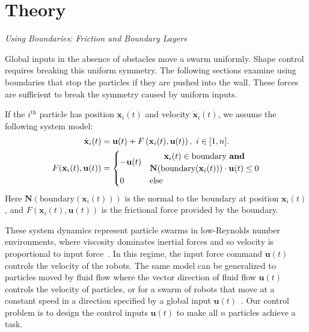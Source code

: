 \section{Theory}
\label{sec:theory}

\emph{Using Boundaries: Friction and Boundary Layers}\label{subsec:WallFriction}

Global inputs in the absence of obstacles move a swarm uniformly.  
Shape control requires breaking this uniform symmetry.
The following sections examine using boundaries that stop the particles if they are pushed into the wall.
 These forces are  sufficient to break the symmetry caused by uniform inputs.  
 
 If the $i^{\textrm{th}}$ particle has position $\mathbf{x}_i(t)$ and velocity $\dot{\mathbf{x}}_i(t)$,  we assume the following system model:
 \begin{align}\label{eq:swarmDynamicsAndFric} 
\dot{\mathbf{x}}_i(t)
 &=
 \mathbf{u}(t)
 +F \left( \mathbf{x}_i(t), \mathbf{u}(t) \right), ~i \in [1,n].\\
 F(\mathbf{x}_i(t), \mathbf{u}(t)) &= \begin{cases}
  - \mathbf{u}(t) &\begin{matrix} \mathbf{x}_i(t) \in  \textrm{boundary \textbf{and}}\\
\mathbf{N}(\textrm{boundary$(\mathbf{x}_i(t))$})\cdot   \mathbf{u}(t) \le 0 \end{matrix}
 \\
 0 & \textrm{else} 
 \end{cases}\nonumber
 \end{align}
 Here $\mathbf{N}(\textrm{boundary$(\mathbf{x}_i(t))$})$ is the normal to the boundary at position $\mathbf{x}_i(t)$, and
 $F(\mathbf{x}_i(t), \mathbf{u}(t)) $ is the frictional force provided by the boundary.
 
 
These system dynamics represent particle swarms in low-Reynolds number environments, where viscosity dominates inertial forces and so velocity is proportional to input force~\cite{Purcell1977}. 
 In this regime, the input force command $\mathbf{u}(t)$ controls the velocity of the robots.  
  The same model can be generalized to particles moved by fluid flow where the vector direction of fluid flow $\mathbf{u}(t)$ controls the velocity of particles, or for a swarm of robots that move at a constant speed in a direction specified by a global input $\mathbf{u}(t)$~\cite{Rubenstein2012}.
 Our control problem is to design the control inputs $\mathbf{u}(t)$ to make all $n$ particles achieve a task.